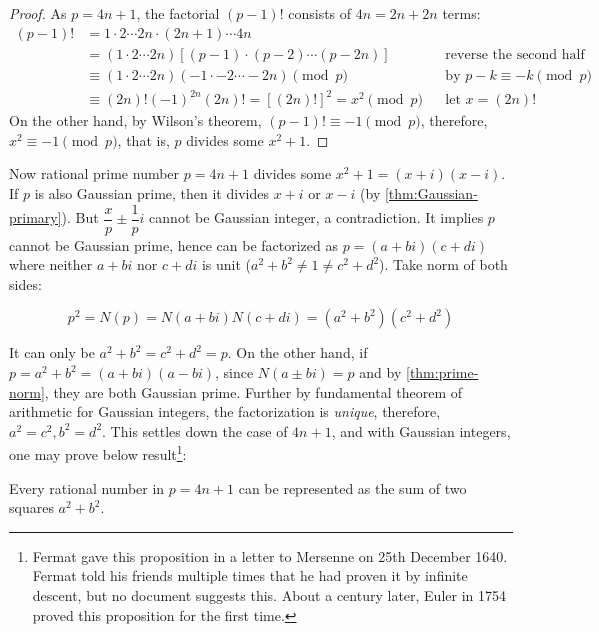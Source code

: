 \documentclass[b5paper]{article}
\begin{document}
\begin{proof}
As $p = 4n + 1$, the factorial $(p - 1)!$ consists of $4n = 2n + 2n$ terms:
\begin{align*}
(p - 1)! &= 1 \cdot 2  \dotsm  2n \cdot (2n + 1)  \dotsm  4n \\
  &= (1 \cdot 2  \dotsm  2n)[(p - 1) \cdot (p - 2)  \dotsm  (p - 2n)] && \text{reverse the second half} \\
  &\equiv (1 \cdot 2  \dotsm 2n)(-1 \cdot -2 \dotsm -2n) \pmod p && \text{by } p - k \equiv -k \pmod p \\
  &\equiv (2n)!(-1)^{2n}(2n)! = [(2n)!]^2 = x^2 \pmod p && \text{let } x = (2n)!
\end{align*}
On the other hand, by Wilson's theorem, $(p - 1)! \equiv -1 \pmod p$, therefore, $x^2 \equiv -1 \pmod p$, that is, $p$ divides some $x^2 + 1$.
\end{proof}

Now rational prime number $p = 4n + 1$ divides some $x^2 + 1 = (x + i)(x - i)$. If $p$ is also Gaussian prime, then it divides $x + i$ or $x - i$ (by \cref{thm:Gaussian-primary}). But $\dfrac{x}{p} \pm \dfrac{1}{p}i$ cannot be Gaussian integer, a contradiction. It implies $p$ cannot be Gaussian prime, hence can be factorized as $p = (a + bi)(c + di)$ where neither $a + bi$ nor $c + di$ is unit ($a^2 + b^2 \ne 1 \ne c^2 + d^2$). Take norm of both sides:

\[
p^2 = N(p) = N(a+bi)N(c+di) = (a^2 + b^2)(c^2 + d^2)
\]

It can only be $a^2 + b^2 = c^2 + d^2 = p$. On the other hand, if $p = a^2 + b^2 = (a + bi)(a - bi)$, since $N(a \pm bi) = p$ and by \cref{thm:prime-norm}, they are both Gaussian prime. Further by fundamental theorem of arithmetic for Gaussian integers, the factorization is \emph{unique}, therefore, $a^2 = c^2, b^2 = d^2$. This settles down the case of $4n + 1$, and with Gaussian integers, one may prove below result\footnote{Fermat gave this proposition in a letter to Mersenne on 25th December 1640. Fermat told his friends multiple times that he had proven it by infinite descent, but no document suggests this. About a century later, Euler in 1754 proved this proposition for the first time.}:

\begin{theorem}
Every rational number in $p = 4n + 1$ can be represented as the sum of two squares $a^2 + b^2$.
\end{theorem}
\end{document}
